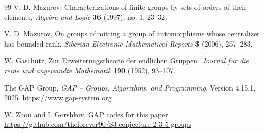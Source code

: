 \documentclass[11pt]{article}
\begin{document}
\begin{thebibliography}{99}
    V. D. Mazurov,
    Characterizations of finite groups by sets of orders of their elements,
    \textit{Algebra and Logic} \textbf{36} (1997), no. 1, 23--32.

    V. D. Mazurov,
    On groups admitting a group of automorphisms whose centralizer has bounded rank,
    \textit{Siberian Electronic Mathematical Reports} \textbf{3} (2006), 257--283.

    W. Gasch\"utz,
    Zur Erweiterungstheorie der endlichen Gruppen,
    \textit{Journal f\"ur die reine und angewandte Mathematik} \textbf{190} (1952), 93--107.


    The GAP Group,
    \textit{GAP -- Groups, Algorithms, and Programming}, Version 4.15.1, 2025.
    \url{https://www.gap-system.org}

    W. Zhou and I. Gorshkov,
    GAP codes for this paper.
    \url{https://github.com/theforever90/S3-conjecture-2-3-5-groups}
\end{thebibliography}
\end{document}
